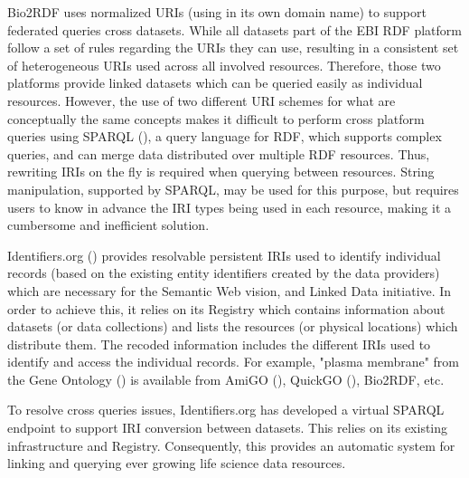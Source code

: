 \documentclass{bioinfo}
\begin{document}
Bio2RDF uses normalized URIs (using in its own domain name) to support federated queries cross datasets. While all datasets part of the EBI RDF platform follow a set of rules regarding the URIs they can use, resulting in a consistent set of heterogeneous URIs used across all involved resources. Therefore, those two platforms provide linked datasets which can be queried easily as individual resources. However, the use of two different URI schemes for what are conceptually the same concepts makes it difficult to perform cross platform queries using SPARQL (\cite{Prud'hommeaux2008}), a query language for RDF, which supports complex queries, and can merge data distributed over multiple RDF resources. Thus, rewriting IRIs on the fly is required when querying between resources. String manipulation, supported by SPARQL, may be used for this purpose, but requires users to know in advance the IRI types being used in each resource, making it a cumbersome and inefficient solution.

Identifiers.org (\cite{Juty01012012}) provides resolvable persistent IRIs used to identify individual records (based on the existing entity identifiers created by the data providers) which are necessary for the Semantic Web vision, and Linked Data initiative. In order to achieve this, it relies on its Registry which contains information about datasets (or data collections) and lists the resources (or physical locations) which distribute them. The recoded information includes the different IRIs used to identify and access the individual records. For example, "plasma membrane" from the Gene Ontology (\cite{Ashburner2000}) is available from AmiGO (\cite{Carbon2009}), QuickGO (\cite{Binns2009}), Bio2RDF, etc.

To resolve cross queries issues, Identifiers.org has developed a virtual SPARQL endpoint to support IRI conversion between datasets. This relies on its existing infrastructure and Registry. Consequently, this provides an automatic system for linking and querying ever growing life science data resources.

\end{document}
